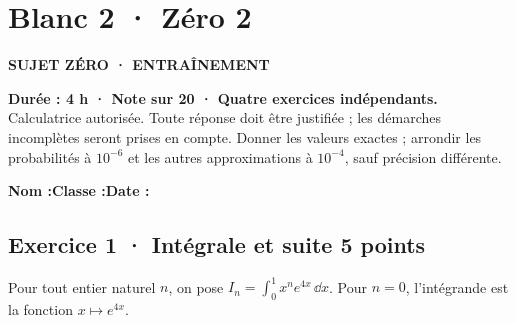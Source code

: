 \fi

\mxnewpage{}\label{sujet:8-2}

\section*{Blanc 2 · Zéro 2}

{\sffamily\bfseries\color{mxmint}SUJET ZÉRO · ENTRAÎNEMENT\par}

\textbf{Durée : 4 h · Note sur 20 · Quatre exercices indépendants.}\\Calculatrice autorisée. Toute réponse doit être justifiée ; les démarches incomplètes seront prises en compte. Donner les valeurs exactes ; arrondir les probabilités à $10^{-6}$ et les autres approximations à $10^{-4}$, sauf précision différente.

\smallskip\textbf{Nom :}\enspace\dotfill\quad\textbf{Classe :}\enspace\dotfill\quad\textbf{Date :}\enspace\dotfill

\subsection*{Exercice 1 · Intégrale et suite \hfill 5 points}Pour tout entier naturel $n$, on pose $I_n=\displaystyle\int_0^1x^ne^{4x}\,\dd x$. Pour $n=0$, l'intégrande est la fonction $x\mapsto e^{4x}$.

